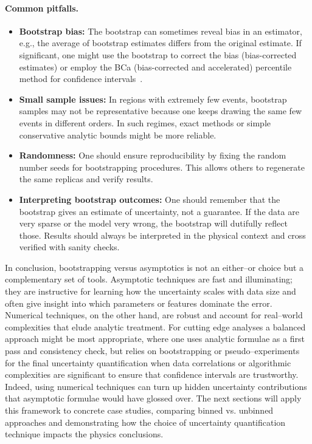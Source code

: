         \paragraph{Common pitfalls.}
            \begin{itemize}
                \item \textbf{Bootstrap bias:}
                    The bootstrap can sometimes reveal bias in an estimator, e.g., the average of bootstrap estimates differs from the original estimate.
                    If significant, one might use the bootstrap to correct the bias (bias-corrected estimates) or employ the BCa (bias-corrected and accelerated) percentile method for confidence intervals~\cite{puth_variety_2015}.
                \item \textbf{Small sample issues:}
                    In regions with extremely few events, bootstrap samples may not be representative because one keeps drawing the same few events in different orders.
                    In such regimes, exact methods or simple conservative analytic bounds might be more reliable.
                \item \textbf{Randomness:}
                    One should ensure reproducibility by fixing the random number seeds for bootstrapping procedures.
                    This allows others to regenerate the same replicas and verify results.
                \item \textbf{Interpreting bootstrap outcomes:}
                    One should remember that the bootstrap gives an estimate of uncertainty, not a guarantee.
                    If the data are very sparse or the model very wrong, the bootstrap will dutifully reflect those.
                    Results should always be interpreted in the physical context and cross verified with sanity checks.
            \end{itemize}
    In conclusion, bootstrapping versus asymptotics is not an either--or choice but a complementary set of tools.
    Asymptotic techniques are fast and illuminating;
    they are instructive for learning how the uncertainty scales with data size and often give insight into which parameters or features dominate the error.
    Numerical techniques, on the other hand, are robust and account for real--world complexities that elude analytic treatment.
    For cutting edge analyses a balanced approach might be most appropriate, where one uses analytic formulae as a first pass and consistency check, but relies on bootstrapping or pseudo--experiments for the final uncertainty quantification when data correlations or algorithmic complexities are significant to ensure that confidence intervals are trustworthy.
    Indeed, using numerical techniques can turn up hidden uncertainty contributions that asymptotic formulae would have glossed over.
    The next sections will apply this framework to concrete case studies, comparing binned vs. unbinned approaches and demonstrating how the choice of uncertainty quantification technique impacts the physics conclusions.
    
